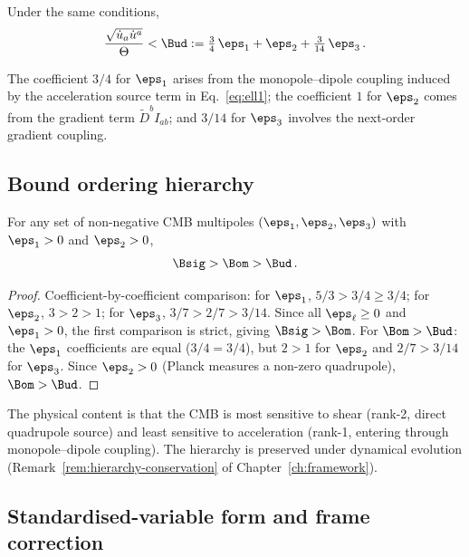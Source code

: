 \begin{theorem}\label{thm:MES-udot}
Under the same conditions,
\begin{equation}\label{eq:Bud-def}
\frac{\sqrt{\dot{u}_a\dot{u}^a}}{\Theta}
< \Bud
:= \tfrac{3}{4}\,\eps_1 + \eps_2 + \tfrac{3}{14}\,\eps_3\,.
\end{equation}
\end{theorem}

The coefficient $3/4$ for $\eps_1$ arises from the monopole--dipole
coupling induced by the acceleration source term in
Eq.~\eqref{eq:ell1}; the coefficient $1$ for $\eps_2$ comes from
the gradient term $\tilde{D}^b I_{ab}$; and $3/14$ for $\eps_3$
involves the next-order gradient coupling.


\subsection{Bound ordering hierarchy}\label{sec:hierarchy}

\begin{proposition}\label{prop:ordering}
For any set of non-negative CMB multipoles
$(\eps_1, \eps_2, \eps_3)$ with $\eps_1 > 0$ and $\eps_2 > 0$,
\begin{equation}\label{eq:ordering}
\Bsig > \Bom > \Bud\,.
\end{equation}
\end{proposition}

\begin{proof}
Coefficient-by-coefficient comparison: for $\eps_1$,
$5/3 > 3/4 \geq 3/4$; for $\eps_2$, $3 > 2 > 1$; for
$\eps_3$, $3/7 > 2/7 > 3/14$.  Since all $\eps_\ell \geq 0$
and $\eps_1 > 0$, the first comparison is strict, giving
$\Bsig > \Bom$.  For $\Bom > \Bud$: the $\eps_1$ coefficients
are equal ($3/4 = 3/4$), but $2 > 1$ for $\eps_2$ and
$2/7 > 3/14$ for $\eps_3$.  Since $\eps_2 > 0$
(Planck measures a non-zero quadrupole), $\Bom > \Bud$.
\end{proof}

The physical content is that the CMB is most
sensitive to shear (rank-2, direct quadrupole source) and least
sensitive to acceleration (rank-1, entering through
monopole--dipole coupling).  The hierarchy is preserved under
dynamical evolution
(Remark~\ref{rem:hierarchy-conservation} of
Chapter~\ref{ch:framework}).


\subsection{Standardised-variable form and frame correction}
\label{sec:std-form}

